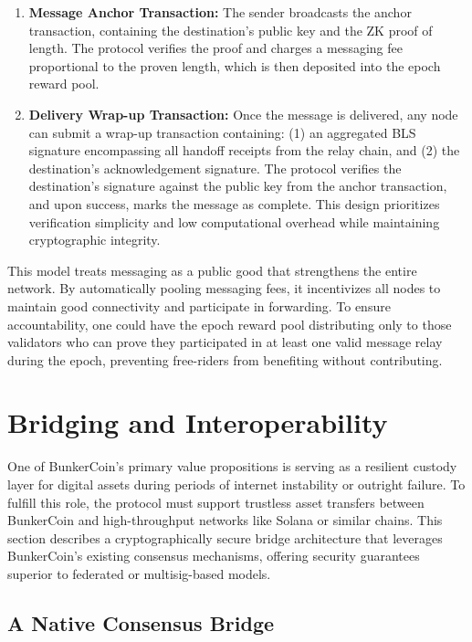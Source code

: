 \documentclass{article}
\begin{document}
\begin{enumerate}
    \item \textbf{Message Anchor Transaction:} The sender broadcasts the anchor transaction, containing the destination's public key and the ZK proof of length. The protocol verifies the proof and charges a messaging fee proportional to the proven length, which is then deposited into the epoch reward pool.
    \item \textbf{Delivery Wrap-up Transaction:} Once the message is delivered, any node can submit a wrap-up transaction containing: (1) an aggregated BLS signature encompassing all handoff receipts from the relay chain, and (2) the destination's acknowledgement signature. The protocol verifies the destination's signature against the public key from the anchor transaction, and upon success, marks the message as complete. This design prioritizes verification simplicity and low computational overhead while maintaining cryptographic integrity.
\end{enumerate}

This model treats messaging as a public good that strengthens the entire network. By automatically pooling messaging fees, it incentivizes all nodes to maintain good connectivity and participate in forwarding. To ensure accountability, one could have the epoch reward pool distributing only to those validators who can prove they participated in at least one valid message relay during the epoch, 
preventing free-riders from benefiting without contributing.

\section{Bridging and Interoperability}
\label{sec:bridge}

One of BunkerCoin's primary value propositions is serving as a resilient custody layer for digital assets during periods of internet instability or outright failure. To fulfill this role, the protocol must support trustless asset transfers between BunkerCoin and high-throughput networks like Solana or similar chains. This section describes a cryptographically secure bridge architecture that leverages BunkerCoin's existing consensus mechanisms, offering security guarantees superior to federated or multisig-based models.

\subsection{A Native Consensus Bridge}
\end{document}
